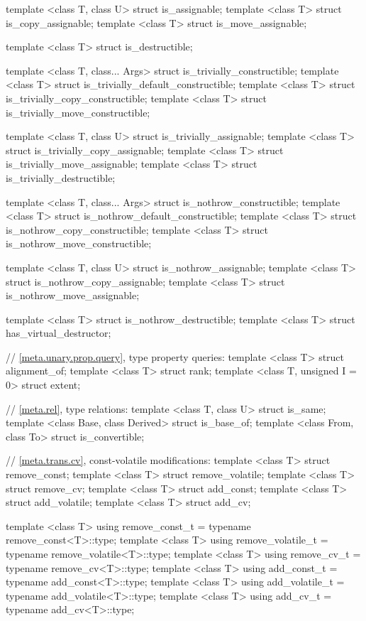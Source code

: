 \begin{codeblock}
{  template <class T, class U> struct is_assignable;
  template <class T> struct is_copy_assignable;
  template <class T> struct is_move_assignable;

  template <class T> struct is_destructible;

  template <class T, class... Args> struct is_trivially_constructible;
  template <class T> struct is_trivially_default_constructible;
  template <class T> struct is_trivially_copy_constructible;
  template <class T> struct is_trivially_move_constructible;

  template <class T, class U> struct is_trivially_assignable;
  template <class T> struct is_trivially_copy_assignable;
  template <class T> struct is_trivially_move_assignable;
  template <class T> struct is_trivially_destructible;

  template <class T, class... Args> struct is_nothrow_constructible;
  template <class T> struct is_nothrow_default_constructible;
  template <class T> struct is_nothrow_copy_constructible;
  template <class T> struct is_nothrow_move_constructible;

  template <class T, class U> struct is_nothrow_assignable;
  template <class T> struct  is_nothrow_copy_assignable;
  template <class T> struct is_nothrow_move_assignable;

  template <class T> struct is_nothrow_destructible;
  template <class T> struct has_virtual_destructor;

  // \ref{meta.unary.prop.query}, type property queries:
  template <class T> struct alignment_of;
  template <class T> struct rank;
  template <class T, unsigned I = 0> struct extent;

  // \ref{meta.rel}, type relations:
  template <class T, class U> struct is_same;
  template <class Base, class Derived> struct is_base_of;
  template <class From, class To> struct is_convertible;

  // \ref{meta.trans.cv}, const-volatile modifications:
  template <class T> struct remove_const;
  template <class T> struct remove_volatile;
  template <class T> struct remove_cv;
  template <class T> struct add_const;
  template <class T> struct add_volatile;
  template <class T> struct add_cv;

  template <class T>
    using remove_const_t    = typename remove_const<T>::type;
  template <class T>
    using remove_volatile_t = typename remove_volatile<T>::type;
  template <class T>
    using remove_cv_t       = typename remove_cv<T>::type;
  template <class T>
    using add_const_t       = typename add_const<T>::type;
  template <class T>
    using add_volatile_t    = typename add_volatile<T>::type;
  template <class T>
    using add_cv_t          = typename add_cv<T>::type;

}
\end{codeblock}

